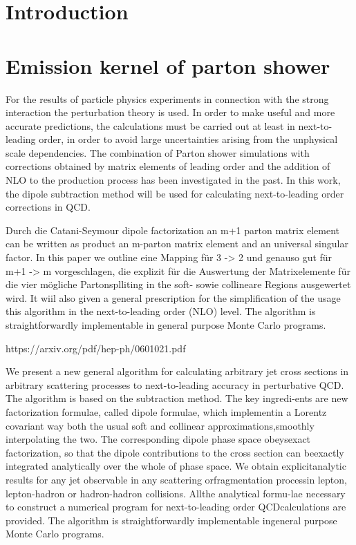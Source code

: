 
\section*{\Large \bfseries Introduction}

\vspace{3cm}


\section*{Emission kernel of parton shower}
For the results of particle physics experiments in connection with the strong interaction the perturbation theory is used. In order to make useful and more accurate predictions, the calculations must be carried out at least in next-to-leading order, in order to avoid large uncertainties arising from the unphysical scale dependencies. The combination of Parton shower simulations with corrections obtained by matrix elements of leading order and the addition of NLO to the production process has been investigated in the past.  
In this work, the dipole subtraction method will be used for calculating next-to-leading order corrections in QCD.



Durch die Catani-Seymour dipole factorization an m+1 parton matrix element can be written as product an m-parton matrix element and an universal singular factor.  
In this paper we outline eine Mapping für 3 -> 2 und genauso gut für m+1 -> m vorgeschlagen, die explizit für die Auswertung der Matrixelemente für die vier mögliche Partonsplliting in the soft- sowie collineare Regions ausgewertet wird. It wiil also given a general prescription for the simplification of the usage this algorithm in the next-to-leading order (NLO) level.  
The algorithm is straightforwardly implementable in general purpose Monte Carlo programs.




https://arxiv.org/pdf/hep-ph/0601021.pdf


 We present a new general algorithm for calculating arbitrary jet cross sections in arbitrary scattering processes to next-to-leading accuracy in perturbative QCD. The algorithm is based on the subtraction method. The key ingredi-ents are new factorization formulae, called dipole formulae, which implementin a Lorentz covariant way both the usual soft and collinear approximations,smoothly interpolating the two. The corresponding dipole phase space obeysexact factorization, so that the dipole contributions to the cross section can beexactly integrated analytically over the whole of phase space. We obtain explicitanalytic results for any jet observable in any scattering orfragmentation processin lepton, lepton-hadron or hadron-hadron collisions. Allthe analytical formu-lae necessary to construct a numerical program for next-to-leading order QCDcalculations are provided. The algorithm is straightforwardly implementable ingeneral purpose Monte Carlo programs.



